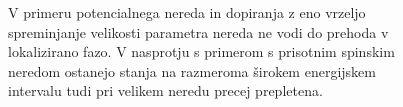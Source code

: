  \begin{figure}[H]
\caption{V primeru potencialnega nereda in dopiranja z eno vrzeljo spreminjanje velikosti parametra nereda ne vodi do prehoda v lokalizirano fazo. V nasprotju s primerom s prisotnim spinskim neredom ostanejo stanja na razmeroma širokem energijskem intervalu tudi pri velikem neredu precej prepletena.}
\label{fig:H_ent_entro_density_11_5_1}
\end{figure} 
\newpage




